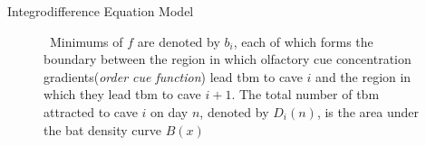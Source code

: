 \documentclass[final]{beamer}
\newlength{\colwidth}
\begin{document}
\begin{frame}[t]
\begin{columns}[t]
\begin{column}{\colwidth}
\begin{block}{Integrodifference Equation Model}
\begin{figure}
\hfill
{}
\hfill
      \caption {\ Minimums of $f$ are denoted by $b_i$, each of which forms the boundary between the region in which olfactory cue concentration gradients(\textit{order cue function}) lead tbm to cave $i$ and the
region in which they lead tbm to cave $i + 1$. The total number of tbm attracted to cave $i$ on day $n$, denoted by $D_i(n)$, is the area under the bat density curve $B(x)$}
    \end{figure}
  \end{block}


\end{column}
\end{columns}
\end{frame}
\end{document}

